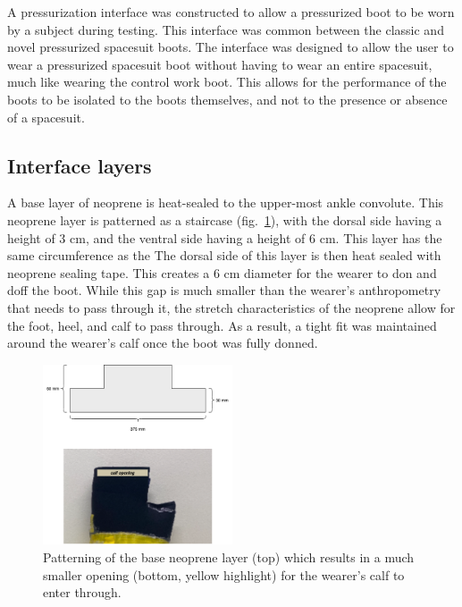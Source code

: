 \documentclass[defaultstyle,11pt]{comps}
\begin{document}
A pressurization interface was constructed to allow a pressurized boot to be worn by a subject during testing.
This interface was common between the classic and novel pressurized spacesuit boots.
The interface was designed to allow the user to wear a pressurized spacesuit boot without having to wear an entire spacesuit, much like wearing the control work boot.
This allows for the performance of the boots to be isolated to the boots themselves, and not to the presence or absence of a spacesuit.

\hypertarget{interface-layers}{%
\subsection{Interface layers}\label{interface-layers}}

A base layer of neoprene is heat-sealed to the upper-most ankle convolute.
This neoprene layer is patterned as a staircase (fig.~\ref{fig:SA4-baseseal}), with the dorsal side having a height of 3 cm, and the ventral side having a height of 6 cm.
This layer has the same circumference as the
The dorsal side of this layer is then heat sealed with neoprene sealing tape.
This creates a 6 cm diameter for the wearer to don and doff the boot.
While this gap is much smaller than the wearer's anthropometry that needs to pass through it, the stretch characteristics of the neoprene allow for the foot, heel, and calf to pass through.
As a result, a tight fit was maintained around the wearer's calf once the boot was fully donned.

\begin{figure}
\hypertarget{fig:SA4-baseseal}{%
\centering
\includegraphics[width=0.5\textwidth,height=\textheight]{../fig/SA4/BaseSeal.png}
\caption{Patterning of the base neoprene layer (top) which results in a much smaller opening (bottom, yellow highlight) for the wearer's calf to enter through.}\label{fig:SA4-baseseal}
}
\end{figure}
\end{document}
